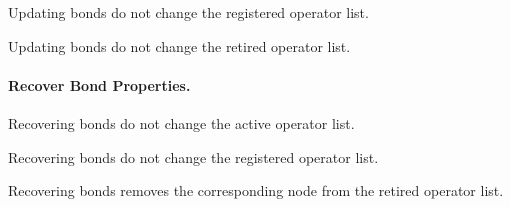 \begin{theorem}
  \leanok
  \label{thm:OperatorDirectory.Properties.Actions.update_bond_hold_same_registered}
  Updating bonds do not change the registered operator list.
  \end{theorem}
\begin{theorem}
  \leanok
  \label{thm:OperatorDirectory.Properties.Actions.update_bond_hold_same_retired}
  Updating bonds do not change the retired operator list.
  \end{theorem}

\paragraph*{Recover Bond Properties.}

\begin{theorem}
  \leanok
  \label{thm:OperatorDirectory.Properties.Actions.recover_bond_same_active}
  Recovering bonds do not change the active operator list.
  \end{theorem}
\begin{theorem}
  \leanok
  \label{thm:OperatorDirectory.Properties.Actions.recover_bond_same_registered}
  Recovering bonds do not change the registered operator list.
  \end{theorem}
\begin{theorem}
  \leanok
  \label{thm:OperatorDirectory.Properties.Actions.recover_bond_retired}
  Recovering bonds removes the corresponding node from the retired operator list.
  \end{theorem}

